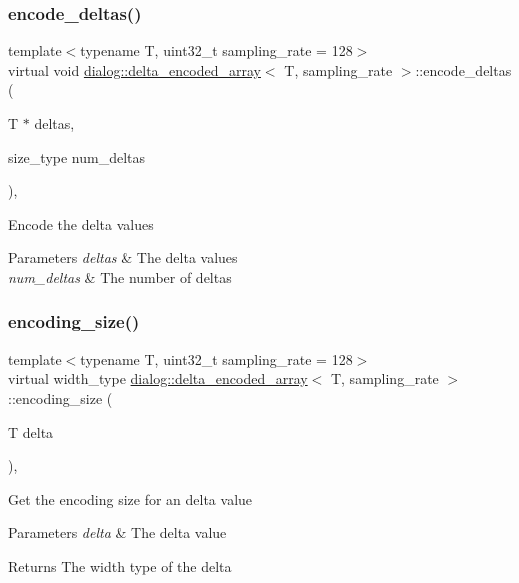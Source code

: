 \subsubsection{\texorpdfstring{encode\+\_\+deltas()}{encode\_deltas()}}
{\footnotesize\ttfamily template$<$typename T, uint32\+\_\+t sampling\+\_\+rate = 128$>$ \\
virtual void \hyperlink{classdialog_1_1delta__encoded__array}{dialog\+::delta\+\_\+encoded\+\_\+array}$<$ T, sampling\+\_\+rate $>$\+::encode\+\_\+deltas (\begin{DoxyParamCaption}\item[{T $\ast$}]{deltas,  }\item[{size\+\_\+type}]{num\+\_\+deltas }\end{DoxyParamCaption})\hspace{0.3cm}{\ttfamily [protected]}, {}}

Encode the delta values 
\begin{DoxyParams}{Parameters}
{\em deltas} & The delta values \\
\hline
{\em num\+\_\+deltas} & The number of deltas \\
\hline
\end{DoxyParams}
\mbox{\label{classdialog_1_1delta__encoded__array_a5a7dd4499765ed12a030b25ca3452ea3}} 
\subsubsection{\texorpdfstring{encoding\+\_\+size()}{encoding\_size()}}
{\footnotesize\ttfamily template$<$typename T, uint32\+\_\+t sampling\+\_\+rate = 128$>$ \\
virtual width\+\_\+type \hyperlink{classdialog_1_1delta__encoded__array}{dialog\+::delta\+\_\+encoded\+\_\+array}$<$ T, sampling\+\_\+rate $>$\+::encoding\+\_\+size (\begin{DoxyParamCaption}\item[{T}]{delta }\end{DoxyParamCaption})\hspace{0.3cm}{\ttfamily [protected]}, {}}

Get the encoding size for an delta value 
\begin{DoxyParams}{Parameters}
{\em delta} & The delta value \\
\hline
\end{DoxyParams}
\begin{DoxyReturn}{Returns}
The width type of the delta 
\end{DoxyReturn}
\mbox{\label{classdialog_1_1delta__encoded__array_a533eeb8833bb554513c86eb7f1ce635f}} 
